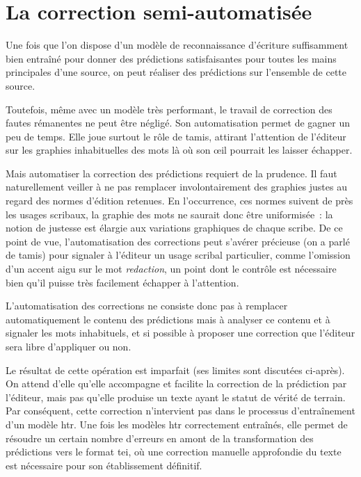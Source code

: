 \documentclass[a4paper,12pt,twoside]{book}
\begin{document}
		\section{La correction semi-automatisée}
			Une fois que l'on dispose d'un modèle de reconnaissance d'écriture suffisamment bien entraîné pour donner des \glspl{prédiction} satisfaisantes pour toutes les mains principales d'une source, on peut réaliser des \glspl{prédiction} sur l'ensemble de cette source.
			
			Toutefois, même avec un modèle très performant, le travail de correction des fautes rémanentes ne peut être négligé. Son automatisation permet de gagner un peu de temps. Elle joue surtout le rôle de tamis, attirant l'attention de l'éditeur sur les graphies inhabituelles des mots là où son œil pourrait les laisser échapper.
			
			Mais automatiser la correction des \glspl{prédiction} requiert de la prudence. Il faut naturellement veiller à ne pas remplacer involontairement des graphies justes au regard des normes d'édition retenues. En l'occurrence, ces normes suivent de près les usages scribaux, la graphie des mots ne saurait donc être uniformisée~: la notion de justesse est élargie aux variations graphiques de chaque scribe. De ce point de vue, l'automatisation des corrections peut s'avérer précieuse (on a parlé de tamis) pour signaler à l'éditeur un usage scribal particulier, comme l'omission d'un accent aigu sur le mot \textit{redaction}, un point dont le contrôle est nécessaire bien qu'il puisse très facilement échapper à l'attention.
			
			L'automatisation des corrections ne consiste donc pas à remplacer automatiquement le contenu des \glspl{prédiction} mais à analyser ce contenu et à signaler les mots inhabituels, et si possible à proposer une correction que l'éditeur sera libre d'appliquer ou non.
			
			Le résultat de cette opération est imparfait (ses limites sont discutées ci-après). On attend d'elle qu'elle accompagne et facilite la correction de la \gls{prédiction} par l'éditeur, mais pas qu'elle produise un texte ayant le statut de vérité de terrain. Par conséquent, cette correction n'intervient pas dans le processus d'entraînement d'un modèle \gls{htr}. Une fois les modèles \gls{htr} correctement entraînés, elle permet de résoudre un certain nombre d'erreurs en amont de la transformation des \glspl{prédiction} vers le format \gls{tei}, où une correction manuelle approfondie du texte est nécessaire pour son établissement définitif.
			
\end{document}
